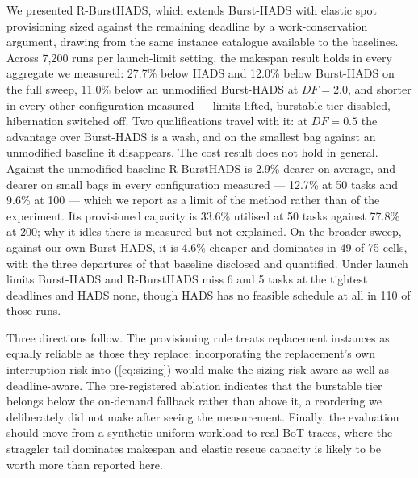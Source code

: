 \documentclass[conference]{IEEEtran}
\begin{document}
We presented R-BurstHADS, which extends Burst-HADS with elastic spot
provisioning sized against the remaining deadline by a work-conservation
argument, drawing from the same instance catalogue available to the baselines.
Across 7{,}200 runs per launch-limit setting, the makespan result holds in
every aggregate we measured: 27.7\% below HADS and 12.0\% below Burst-HADS on the
full sweep, 11.0\% below an unmodified Burst-HADS at $\mathit{DF} = 2.0$, and
shorter in every other configuration measured --- limits lifted, burstable tier
disabled, hibernation switched off. Two qualifications travel with it: at
$\mathit{DF} = 0.5$ the advantage over Burst-HADS is a wash, and on the smallest
bag against an unmodified baseline it disappears. The cost result does not hold
in general. Against
the unmodified baseline R-BurstHADS is 2.9\% dearer on average, and dearer on
small bags in every configuration measured --- 12.7\% at 50 tasks and 9.6\% at
100 --- which we report as a limit of the method rather than of the
experiment. Its provisioned capacity is 33.6\% utilised at 50 tasks against
77.8\% at 200; why it idles there is measured but not explained. On the
broader sweep, against our own Burst-HADS, it is 4.6\% cheaper and dominates in
49 of 75 cells, with the three departures of that baseline disclosed and
quantified. Under launch limits Burst-HADS and R-BurstHADS miss 6 and 5 tasks
at the tightest deadlines and HADS none, though HADS has no feasible schedule
at all in 110 of those runs.

Three directions follow. The provisioning rule treats replacement instances as
equally reliable as those they replace; incorporating the replacement's own
interruption risk into (\ref{eq:sizing}) would make the sizing risk-aware as
well as deadline-aware. The pre-registered ablation indicates that the
burstable tier belongs below the on-demand fallback rather than above it, a
reordering we deliberately did not make after seeing the measurement. Finally,
the evaluation should move from a synthetic uniform workload to real BoT
traces, where the straggler tail dominates makespan and elastic rescue capacity
is likely to be worth more than reported here.

\appendices

\end{document}
